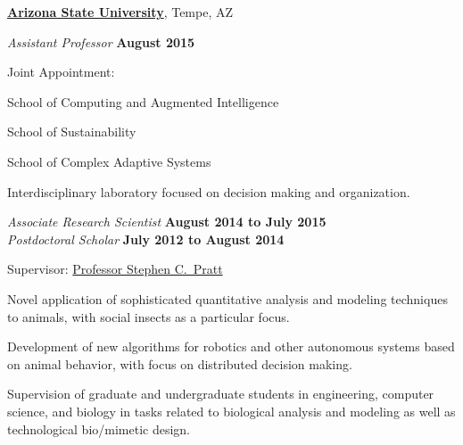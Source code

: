 \documentclass[10pt]{article}           %
\newcommand{\entry}{\item[{}]}
\begin{document}
\href{http://www.asu.edu/}{\textbf{Arizona State University}},
Tempe, AZ
\begin{cvlist}[loose]

    \entry \textit{Assistant Professor}%
            \hfill \textbf{August 2015}
    \begin{cvlist}
        \item Joint Appointment:
        \begin{cvlist}
            \item School of Computing and Augmented Intelligence
            \item School of Sustainability
            \item School of Complex Adaptive Systems
        \end{cvlist}


        \item Interdisciplinary laboratory focused on decision
            making and organization.
    \end{cvlist}

    \entry \textit{Associate Research Scientist}%
            \hfill \textbf{August 2014 to July 2015}\\
        \textit{Postdoctoral Scholar}%
            \hfill \textbf{July 2012 to August 2014}
    \begin{cvlist}
        \item Supervisor:
                \href{http://www.public.asu.edu/~spratt1/}%
                     {Professor Stephen C.~Pratt}

        \item Novel application of sophisticated quantitative
            analysis and modeling techniques to animals, with
            social insects as a particular focus.

        \item Development of new algorithms for robotics and
            other autonomous systems based on animal behavior,
            with focus on distributed decision making.

        \item Supervision of graduate and undergraduate students
            in engineering, computer science, and biology in
            tasks related to biological analysis and modeling as
            well as technological bio\-/mimetic design.
    \end{cvlist}

\end{cvlist}
\end{document}

